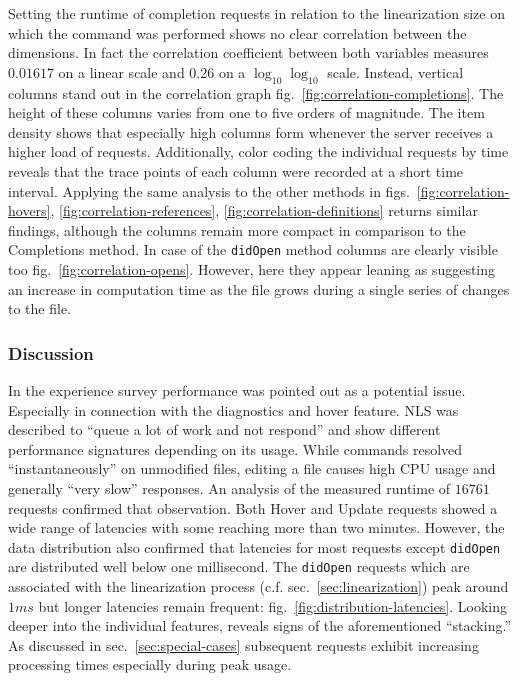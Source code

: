 \documentclass[
  a4paper,
  bibtex,
  english,
  nomenclature]{kthlatex/kththesis/kththesis}
\begin{document}
Setting the runtime of completion requests in relation to the
linearization size on which the command was performed shows no clear
correlation between the dimensions. In fact the correlation coefficient
between both variables measures \(0.01617\) on a linear scale and
\(0.26\) on a \(\log_{10}\log_{10}\) scale. Instead, vertical columns
stand out in the correlation graph
fig.~\ref{fig:correlation-completions}. The height of these columns
varies from one to five orders of magnitude. The item density shows that
especially high columns form whenever the server receives a higher load
of requests. Additionally, color coding the individual requests by time
reveals that the trace points of each column were recorded at a short
time interval. Applying the same analysis to the other methods in
figs.~\ref{fig:correlation-hovers}, \ref{fig:correlation-references}, \ref{fig:correlation-definitions}
returns similar findings, although the columns remain more compact in
comparison to the Completions method. In case of the \texttt{didOpen}
method columns are clearly visible too fig.~\ref{fig:correlation-opens}.
However, here they appear leaning as suggesting an increase in
computation time as the file grows during a single series of changes to
the file.

\hypertarget{sec:discussion-1}{%
\subsubsection{Discussion}\label{sec:discussion-1}}

In the experience survey performance was pointed out as a potential
issue. Especially in connection with the diagnostics and hover feature.
NLS was described to ``queue a lot of work and not respond'' and show
different performance signatures depending on its usage. While commands
resolved ``instantaneously'' on unmodified files, editing a file causes
high CPU usage and generally ``very slow'' responses. An analysis of the
measured runtime of \(16761\) requests confirmed that observation. Both
Hover and Update requests showed a wide range of latencies with some
reaching more than two minutes. However, the data distribution also
confirmed that latencies for most requests except \texttt{didOpen} are
distributed well below one millisecond. The \texttt{didOpen} requests
which are associated with the linearization process (c.f.
sec.~\ref{sec:linearization}) peak around \(1ms\) but longer latencies
remain frequent: fig.~\ref{fig:distribution-latencies}. Looking deeper
into the individual features, reveals signs of the aforementioned
``stacking.'' As discussed in sec.~\ref{sec:special-cases} subsequent
requests exhibit increasing processing times especially during peak
usage.
\end{document}
